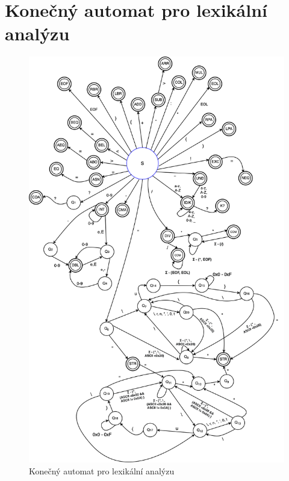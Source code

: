 \documentclass[a4paper, 11pt]{article}
\begin{document}
\newpage
\section*{Konečný automat pro lexikální analýzu}
\label{sec:fa}
\begin{figure}[!ht]
	\centering
	\vspace{-0.8cm}
	\includegraphics[width=1\linewidth, height=1.3\linewidth]{include/lex_fa.png}
	\caption{Konečný automat pro lexikální analýzu}
	\label{fig:fa}
\end{figure}
\end{document}
